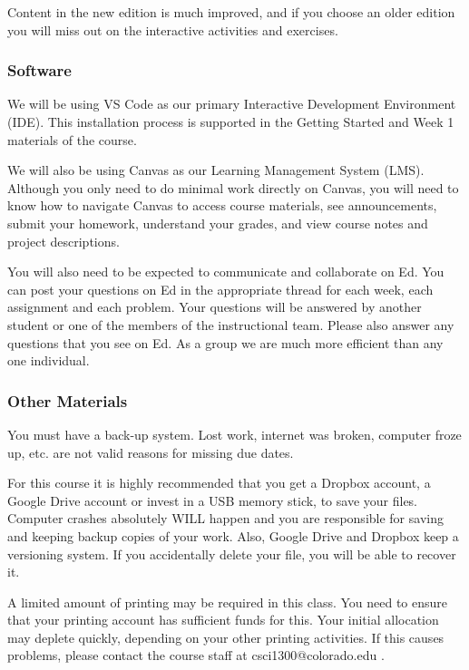 Content in the new edition is much improved, and if you choose an older edition you will miss out on the interactive activities and exercises.

\subsubsection{Software}

We will be using VS Code as our primary Interactive Development Environment (IDE). This installation process is supported in the Getting Started and Week 1 materials of the course.

We will also be using Canvas as our Learning Management System (LMS). Although you only need to do minimal work directly on Canvas, you will need to know how to navigate Canvas to access course materials, see announcements, submit your homework, understand your grades, and view course notes and project descriptions.

You will also need to be expected to communicate and collaborate on Ed. You can post your questions on Ed in the appropriate thread for each week, each assignment and each problem. Your questions will be answered by another student or one of the members of the instructional team. Please also answer any questions that you see on Ed. As a group we are much more efficient than any one individual.

\subsubsection{Other Materials}

You must have a back-up system. Lost work, internet was broken, computer froze up, etc. are not valid reasons for missing due dates.

For this course it is highly recommended that you get a Dropbox account, a Google Drive account or invest in a USB memory stick, to save your files. Computer crashes absolutely WILL happen and you are responsible for saving and keeping backup copies of your work. Also, Google Drive and Dropbox keep a versioning system. If you accidentally delete your file, you will be able to recover it.

A limited amount of printing may be required in this class. You need to ensure that your printing account has sufficient funds for this. Your initial allocation may deplete quickly, depending on your other printing activities. If this causes problems, please contact the course staff at csci1300@colorado.edu .
    
